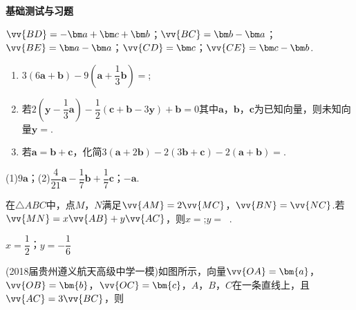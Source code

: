 \begin{exercise}{\textbf{基础测试与习题}}
\begin{flushright}
\begin{tikzpicture}
        \end{tikzpicture}
      \end{flushright}
      \begin{answer}
        $\vv{BD}=-\bm a+\bm c+\bm b$；$\vv{BC}=\bm b-\bm a$；$\vv{BE}=\bm a-\bm a$；$\vv{CD}=\bm c$；$\vv{CE}=\bm c-\bm b$.
      \end{answer}
    \item
      \begin{enumerate}[label=\arabic*)]
        \item $3(6\bm{a}+\bm{b})-9(\bm{a}+\dfrac13\bm{b})=$\tk;
        \item 若$2(\bm{y}-\dfrac13\bm{a})-\dfrac12(\bm c+\bm b-3\bm y)+\bm b=0$其中$\bm a$，$\bm b$，$\bm c$为已知向量，则未知向量$\bm y=$\tk.
        \item 若$\bm a=\bm b+\bm c$，化简$3(\bm a+2\bm b)-2(3\bm b+\bm c)-2(\bm a+\bm b)=$\tk.
      \end{enumerate}
      \begin{answer}
        (1)$9\bm a$；(2)$\dfrac4{21}\bm a-\dfrac17\bm b+\dfrac17\bm c$；$-\bm a$.
      \end{answer}
    \begin{minipage}[b]{0.65\linewidth}
    \item%
      在$\triangle ABC$中，点$ M$，$N $满足$ \vv{AM}=2\vv{MC}$，$\vv{BN}=\vv{NC}$.若$\vv{MN}=x\vv{AB}+y\vv{AC}$，则$ x= $\tk;$ y= ~$ \tk.
      \begin{answer}
        $x=\dfrac12$；$y=-\dfrac16$
      \end{answer}
    \end{minipage}
    \begin{minipage}[htbp!]{0.3\linewidth}
      \begin{center}
      \end{center}
    \end{minipage}
    \item
      (2018届贵州遵义航天高级中学一模)如图所示，向量$\vv{OA}=\bm{a}$，$\vv{OB}=\bm{b}$，$\vv{OC}=\bm{c}$，$A$，$B$，$C$在一条直线上，且$\vv{AC}=3\vv{BC}$，则\xz

\end{exercise}
